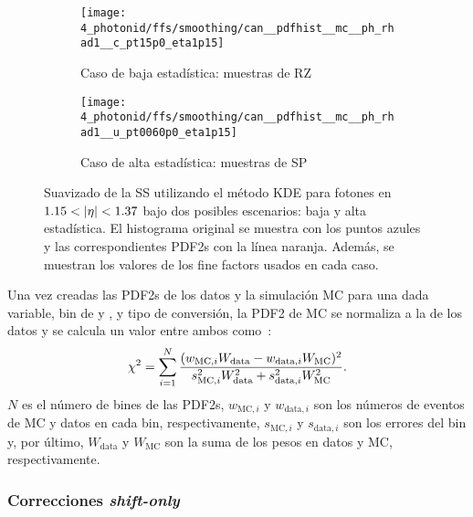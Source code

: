 \begin{figure}[ht!]
    \centering
    \begin{subfigure}[h]{0.49\linewidth}
        \centering
        \texttt{[image: 4\_photonid/ffs/smoothing/can\_\_pdfhist\_\_mc\_\_ph\_rhad1\_\_c\_pt15p0\_eta1p15]}
        \caption{Caso de baja estad\'istica: muestras de \ac{RZ}}
    \end{subfigure}
    \hfill
    \begin{subfigure}[h]{0.49\linewidth}
        \centering
        \texttt{[image: 4\_photonid/ffs/smoothing/can\_\_pdfhist\_\_mc\_\_ph\_rhad1\_\_u\_pt0060p0\_eta1p15]}
        \caption{Caso de alta estad\'istica: muestras de \ac{SP}}
    \end{subfigure}
    \caption{Suavizado de la \ac{SS} \rhad utilizando el m\'etodo \ac{KDE} para fotones en \(1.15<\abseta<1.37\) bajo dos posibles escenarios: baja y alta estad\'istica. El histograma original se muestra con los puntos azules y las correspondientes \acp{PDF2} con la l\'inea naranja. Adem\'as, se muestran los valores de los fine factors usados en cada caso.}
    \label{fig:ss_corrections:ffs:calculation:smoothing_ss}
\end{figure}


Una vez creadas las \acp{PDF2} de los datos y la simulaci\'on \ac{MC} para una dada variable, bin de \pt y \abseta, y tipo de conversión, la \ac{PDF2} de \ac{MC} se normaliza a la de los datos y se calcula un valor \chisq entre ambos como~\cite{Chi2Histograms}:
\begin{equation}
	\chi^{2} = \sum_{i=1}^{N} \dfrac{(w_{\text{MC},i} W_{\text{data}} - w_{\text{data},i} W_{\text{MC}})^2}{s_{\text{MC},i}^2 W_{\text{data}}^2 + s_{\text{data},i}^2 W_{\text{MC}}^2}.
\end{equation}
\(N\) es el número de bines de las \acp{PDF2}, \(w_{\text{MC},i}\) y \(w_{\text{data},i}\) son los números de eventos de \ac{MC} y datos en cada bin, respectivamente, \(s_{\text{MC},i}\) y \(s_{\text{data},i}\) son los errores del bin y, por último, \(W_{\text{data}}\) y \(W_{\text{MC}}\) son la suma de los pesos en datos y \ac{MC}, respectivamente.

\subsubsection{Correcciones \textit{shift-only}}

